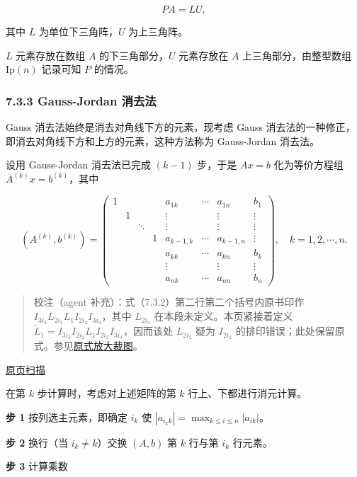 \documentclass[
  10pt,
  fontset=fandol]{ctexart}
\begin{document}
\[PA=LU,\]

其中 \(L\) 为单位下三角阵，\(U\) 为上三角阵。

\(L\) 元素存放在数组 \(A\) 的下三角部分，\(U\) 元素存放在 \(A\) 上三角部分，由整型数组 \(\mathrm{Ip}(n)\) 记录可知 \(P\) 的情况。

\subsubsection{7.3.3 Gauss-Jordan 消去法}\label{gauss-jordan-ux6d88ux53bbux6cd5}

Gauss 消去法始终是消去对角线下方的元素，现考虑 Gauss 消去法的一种修正，即消去对角线下方和上方的元素，这种方法称为 Gauss-Jordan 消去法。

设用 Gauss-Jordan 消去法已完成 \((k-1)\) 步，于是 \(Ax=b\) 化为等价方程组 \(A^{(k)}x=b^{(k)}\)，其中

\[
(A^{(k)},b^{(k)})=\left(\begin{array}{ccccccc|c}
1&&&&a_{1k}&\cdots&a_{1n}&b_1\\
&1&&&\vdots&&\vdots&\vdots\\
&&\ddots&&\vdots&&\vdots&\vdots\\
&&&1&a_{k-1,k}&\cdots&a_{k-1,n}&\vdots\\
&&&&a_{kk}&\cdots&a_{kn}&b_k\\
&&&&\vdots&&\vdots&\vdots\\
&&&&a_{nk}&\cdots&a_{nn}&b_n
\end{array}\right),\quad k=1,2,\cdots,n.
\]

\begin{quote}
校注（agent 补充）：式（7.3.2）第二行第二个括号内原书印作 \(I_{3i_3}L_{2i_2}L_1I_{2i_2}I_{3i_3}\)，其中 \(L_{2i_2}\) 在本段未定义。本页紧接着定义 \(\widetilde{L}_1=I_{3i_3}I_{2i_2}L_1I_{2i_2}I_{3i_3}\)，因而该处 \(L_{2i_2}\) 疑为 \(I_{2i_2}\) 的排印错误；此处保留原式。参见\href{../assets/ch07a/pdf-188-permutation-detail.png}{原式放大裁图}。
\end{quote}

\href{../../source-images/pdf-189.jpeg}{原页扫描}

在第 \(k\) 步计算时，考虑对上述矩阵的第 \(k\) 行上、下都进行消元计算。

\textbf{步 1} 按列选主元素，即确定 \(i_k\) 使 \(|a_{i_kk}|=\max_{k\le i\le n}|a_{ik}|\)。

\textbf{步 2} 换行（当 \(i_k\ne k\)）交换 \((A,b)\) 第 \(k\) 行与第 \(i_k\) 行元素。

\textbf{步 3} 计算乘数
\end{document}
